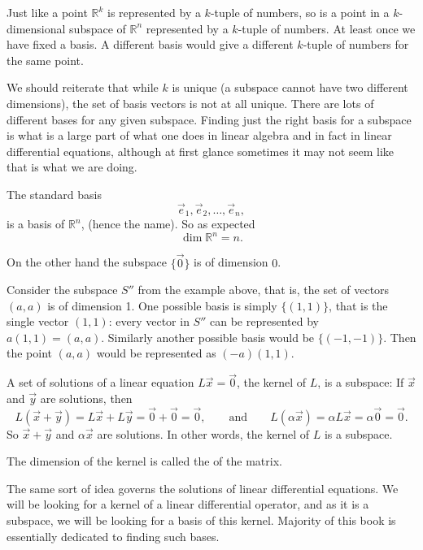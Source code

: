 Just like a point ${\mathbb R}^k$ is represented by a $k$-tuple of
numbers, so is a point in a $k$-dimensional subspace of ${\mathbb R}^n$
represented by a $k$-tuple of numbers.  At least once we have fixed a basis.
A different basis would give a different $k$-tuple of numbers for the same
point.

We should reiterate that while $k$ is unique (a subspace cannot have two different
dimensions), the set of basis vectors is not at all unique.  There are lots
of different bases for any given subspace.  Finding just the right basis for
a subspace is what is a large part of what one does in linear algebra and in
fact in linear differential equations, although at first glance
sometimes it may not seem like that is what we are doing.

\begin{example}
The standard basis
\begin{equation*}
\vec{e}_1, \vec{e}_2, \ldots, \vec{e}_n ,
\end{equation*}
is a basis of ${\mathbb R}^n$, (hence the name).
So as expected
\begin{equation*}
\dim {\mathbb R}^n = n .
\end{equation*}

On the other hand the subspace $\{ \vec{0} \}$ is of dimension $0$.

Consider the subspace $S''$ from the example above, that is, the set of
vectors $(a,a)$ is of dimension 1.  One possible basis is simply
$\{ (1,1) \}$, that is the single
vector $(1,1)$: every vector in $S''$ can be represented by $a (1,1) =
(a,a)$.  Similarly another possible basis would be $\{ (-1,-1) \}$.  Then
the point $(a,a)$ would be represented as $(-a) (1,1)$.
\end{example}

A set of solutions of a linear equation $L\vec{x} = \vec{0}$, 
the kernel of $L$, is a subspace:
If $\vec{x}$ and $\vec{y}$ are solutions,
then
\begin{equation*}
L(\vec{x}+\vec{y}) = 
L\vec{x}+L\vec{y} = 
\vec{0}+\vec{0} = \vec{0} ,
\qquad \text{and} \qquad
L(\alpha \vec{x}) = 
\alpha L \vec{x} = 
\alpha \vec{0} = \vec{0}.
\end{equation*}
So $\vec{x}+\vec{y}$ and $\alpha \vec{x}$ are solutions.  In other words,
the kernel of $L$ is a subspace.

The dimension of the kernel is called the \emph{} of the
matrix.

The same sort of idea governs the solutions of linear differential
equations.  We will be looking for a kernel of a linear differential 
operator, and as it is a subspace, we will be looking for a basis of this
kernel.  Majority of this book is essentially dedicated to finding
such bases.


